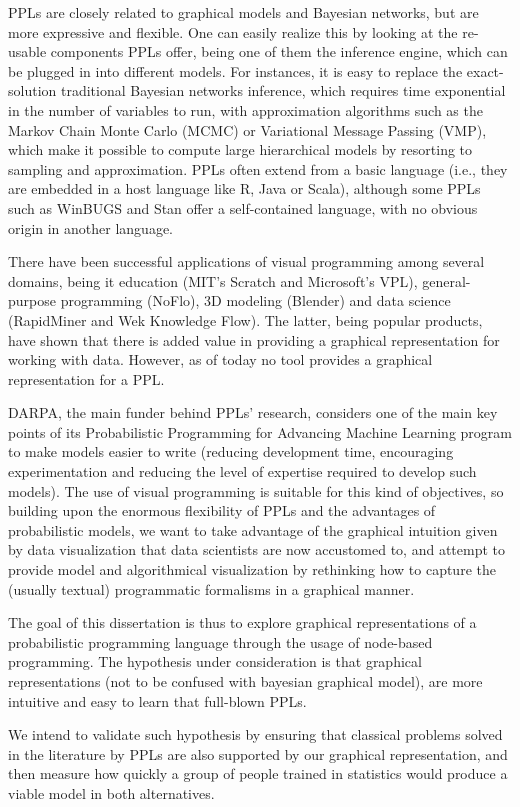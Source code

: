 PPLs are closely related to graphical models and Bayesian networks, but are
more expressive and flexible. One can easily realize this by looking at the
re-usable components PPLs offer, being one of them the inference engine, which
can be plugged in into different models. For instances, it is easy to replace
the exact-solution traditional Bayesian networks inference, which requires time
exponential in the number of variables to run, with approximation algorithms
such as the Markov Chain Monte Carlo (MCMC) or Variational Message Passing
(VMP), which make it possible to compute large hierarchical models by resorting
to sampling and approximation. PPLs often extend from a basic language (i.e.,
they are embedded in a host language like R, Java or Scala), although some PPLs
such as WinBUGS and Stan offer a self-contained language, with no obvious origin
in another language.

There have been successful applications of visual programming among several
domains, being it education (MIT’s Scratch and Microsoft’s VPL), general-purpose
programming (NoFlo), 3D modeling (Blender) and data science (RapidMiner and Wek
 Knowledge Flow). The latter, being popular products, have shown that there is
 added value in providing a graphical representation for working with data.
 However, as of today no tool provides a graphical representation for a PPL.

DARPA, the main funder behind PPLs’ research, considers one of the main key
points of its Probabilistic Programming for Advancing Machine Learning program
to make models easier to write (reducing development time, encouraging
experimentation and reducing the level of expertise required to develop such
models). The use of visual programming is suitable for this kind of objectives,
so building upon the enormous flexibility of PPLs and the advantages of
probabilistic models, we want to take advantage of the graphical intuition given
by data visualization that data scientists are now accustomed to, and attempt
to provide model and algorithmical visualization by rethinking how to capture
the (usually textual) programmatic formalisms in a graphical manner.

The goal of this dissertation is thus to explore graphical representations of a
probabilistic programming language through the usage of node-based programming.
The hypothesis under consideration is that graphical representations (not to be
confused with bayesian graphical model), are more intuitive and easy to learn
that full-blown PPLs.

We intend to validate such hypothesis by ensuring that classical problems solved
in the literature by PPLs are also supported by our graphical representation,
and then measure how quickly a group of people trained in statistics would
produce a viable model in both alternatives.
